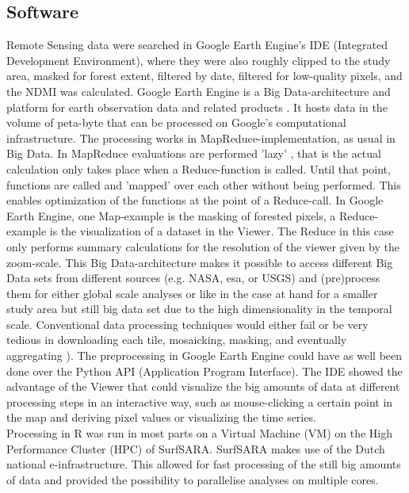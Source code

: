 \subsection{Software}
Remote Sensing data were searched in Google Earth Engine's IDE (Integrated Development Environment), where they were also roughly clipped to the study area, masked for forest extent, filtered by date, filtered for low-quality pixels, and the NDMI was calculated. Google Earth Engine is a Big Data-architecture and platform for earth observation data and related products \citep{gorelick2017}. It hosts data in the volume of peta-byte that can be processed on Google's computational infrastructure. The processing works in MapReduce-implementation, as usual in Big Data. In MapReduce evaluations are performed 'lazy' \citep{dean2008}, that is the actual calculation only takes place when a Reduce-function is called. Until that point, functions are called and 'mapped' over each other without being performed. This enables optimization of the functions at the point of a Reduce-call. In Google Earth Engine, one Map-example is the masking of forested pixels, a Reduce-example is the visualization of a dataset in the Viewer. The Reduce in this case only performs summary calculations for the resolution of the viewer given by the zoom-scale. This Big Data-architecture makes it possible to access different Big Data sets from different sources (e.g. NASA, esa, or USGS) and (pre)process them for either global scale analyses or like in the case at hand for a smaller study area but still big data set due to the high dimensionality in the temporal scale. Conventional data processing techniques would either fail or be very tedious in downloading each tile, mosaicking, masking, and eventually aggregating \citep[study area spanning over four MODIS tiles of which each ca.~93~MB per time step][]{modisvcf}). The preprocessing in Google Earth Engine could have as well been done over the Python API (Application Program Interface). The IDE showed the advantage of the Viewer that could visualize the big amounts of data at different processing steps in an interactive way, such as mouse-clicking a certain point in the map and deriving pixel values or visualizing the time series.\\
Processing in R was run in most parts on a Virtual Machine (VM) on the High Performance Cluster (HPC) of SurfSARA. SurfSARA makes use of the Dutch national e-infrastructure. This allowed for fast processing of the still big amounts of data and provided the possibility to parallelise analyses on multiple cores.\\
